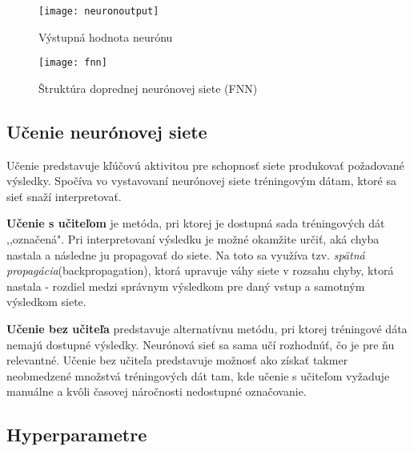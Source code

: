 

\begin{figure}[H]
\begin{center}\texttt{[image: neuronoutput]}\end{center}
\caption[neuronoutput]{Výstupná hodnota neurónu~\cite{kvasnivcka1997uvod}}\label{fig:neuronoutput}
\end{figure}

\noindent



\begin{figure}[H]
\begin{center}\texttt{[image: fnn]}\end{center}
\caption[fnn]{Štruktúra doprednej neurónovej siete (FNN)~\cite{jaeger2002tutorial}}\label{fig:fnn}
\end{figure}

\subsection{Učenie neurónovej siete}
\label{analyza_ucenie_nn}

Učenie predstavuje kľúčovú aktivitou pre schopnosť siete produkovať požadované výsledky. Spočíva vo vystavovaní neurónovej siete tréningovým dátam, ktoré sa sieť snaží interpretovať.

\textbf{Učenie s učiteľom} je metóda, pri ktorej je dostupná sada tréningových dát ,,označená". Pri interpretovaní výsledku je možné okamžite určiť, aká chyba nastala a následne ju propagovať do siete. Na toto sa využíva tzv. \textit{spätná propagácia}(backpropagation), ktorá upravuje váhy siete v rozsahu chyby, ktorá nastala - rozdiel medzi správnym výsledkom pre daný vstup a samotným výsledkom siete.
\noindent

\textbf{Učenie bez učiteľa} predstavuje alternatívnu metódu, pri ktorej tréningové dáta nemajú dostupné výsledky. Neurónová sieť sa sama učí rozhodnúť, čo je pre ňu relevantné. Učenie bez učiteľa predstavuje možnosť ako získať takmer neobmedzené množstvá tréningových dát tam, kde učenie s učiteľom vyžaduje manuálne a kvôli časovej náročnosti nedostupné označovanie.
\noindent


\subsection{Hyperparametre}
\label{analyza_hyperparametre}

